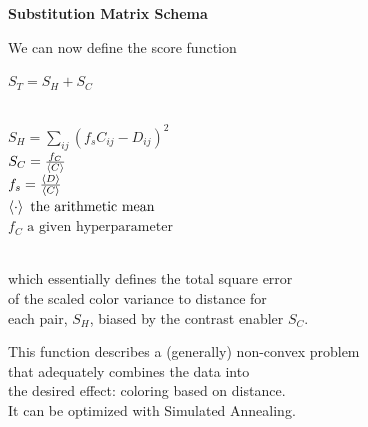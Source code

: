 \documentclass[bigger]{beamer}
\newcommand{\blank}[1]{\hspace*{#1}}
\newcommand{\mysp}{\blank{0.3cm}}
\newcommand{\tb}[1]{\textbf{#1}}
\begin{document}
\begin{frame}{\tb{Substitution Matrix Schema}}
    \footnotesize
    
    We can now define the score function
    \newline\\
    {
        \scriptsize
        \mysp $S_T = S_H + S_C$\\
        \hfill

        \\
        \mysp $S_H = \sum_{ij}(f_sC_{ij} - D_{ij})^2$\\
        \mysp $S_C = \frac{f_C}{\braket{C}}$\\
        \mysp $f_s = \frac{\braket{D}}{\braket{C}}$\\
        \mysp $\braket{\cdot} \text{ the arithmetic mean}$\\
        \mysp $f_C \text{ a given hyperparameter}$
    }
    \newline\\
    which essentially defines the total square error\\
    of the scaled color variance to distance for\\
    each pair, $S_H$, biased by the contrast enabler $S_C$.

    \hfill

    This function describes a (generally) non-convex problem\\
    that adequately combines the data into\\
    the desired effect: coloring based on distance.\\
    It can be optimized with Simulated Annealing.
    
\end{frame}
\end{document}
